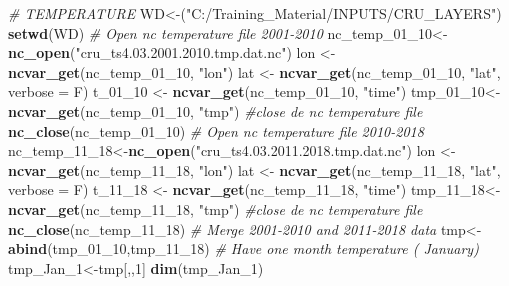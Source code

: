 \documentclass[
  10pt,
  b5paper,
]{book}
\newenvironment{Shaded}{\begin{snugshade}}{\end{snugshade}}
\newcommand{\CommentTok}[1]{\textcolor[rgb]{0.56,0.35,0.01}{\textit{#1}}}
\newcommand{\DataTypeTok}[1]{\textcolor[rgb]{0.13,0.29,0.53}{#1}}
\newcommand{\DecValTok}[1]{\textcolor[rgb]{0.00,0.00,0.81}{#1}}
\newcommand{\KeywordTok}[1]{\textcolor[rgb]{0.13,0.29,0.53}{\textbf{#1}}}
\newcommand{\NormalTok}[1]{#1}
\newcommand{\StringTok}[1]{\textcolor[rgb]{0.31,0.60,0.02}{#1}}
\begin{document}
\begin{Shaded}
\begin{Highlighting}[]
\CommentTok{# TEMPERATURE}
\NormalTok{WD<-(}\StringTok{"C:/Training_Material/INPUTS/CRU_LAYERS"}\NormalTok{)}
\KeywordTok{setwd}\NormalTok{(WD)}
 \CommentTok{# Open nc temperature file 2001-2010}
\NormalTok{nc_temp_}\DecValTok{01}\NormalTok{_}\DecValTok{10}\NormalTok{<-}\KeywordTok{nc_open}\NormalTok{(}\StringTok{"cru_ts4.03.2001.2010.tmp.dat.nc"}\NormalTok{)}
\NormalTok{ lon <-}\StringTok{ }\KeywordTok{ncvar_get}\NormalTok{(nc_temp_}\DecValTok{01}\NormalTok{_}\DecValTok{10}\NormalTok{, }\StringTok{"lon"}\NormalTok{)}
\NormalTok{lat <-}\StringTok{ }\KeywordTok{ncvar_get}\NormalTok{(nc_temp_}\DecValTok{01}\NormalTok{_}\DecValTok{10}\NormalTok{, }\StringTok{"lat"}\NormalTok{, }\DataTypeTok{verbose =}\NormalTok{ F)}
\NormalTok{t_}\DecValTok{01}\NormalTok{_}\DecValTok{10}\NormalTok{ <-}\StringTok{ }\KeywordTok{ncvar_get}\NormalTok{(nc_temp_}\DecValTok{01}\NormalTok{_}\DecValTok{10}\NormalTok{, }\StringTok{"time"}\NormalTok{)}
\NormalTok{ tmp_}\DecValTok{01}\NormalTok{_}\DecValTok{10}\NormalTok{<-}\KeywordTok{ncvar_get}\NormalTok{(nc_temp_}\DecValTok{01}\NormalTok{_}\DecValTok{10}\NormalTok{, }\StringTok{"tmp"}\NormalTok{)}
 \CommentTok{#close de nc temperature file}
 \KeywordTok{nc_close}\NormalTok{(nc_temp_}\DecValTok{01}\NormalTok{_}\DecValTok{10}\NormalTok{) }
 \CommentTok{# Open nc temperature file 2010-2018}
\NormalTok{nc_temp_}\DecValTok{11}\NormalTok{_}\DecValTok{18}\NormalTok{<-}\KeywordTok{nc_open}\NormalTok{(}\StringTok{"cru_ts4.03.2011.2018.tmp.dat.nc"}\NormalTok{)}
\NormalTok{ lon <-}\StringTok{ }\KeywordTok{ncvar_get}\NormalTok{(nc_temp_}\DecValTok{11}\NormalTok{_}\DecValTok{18}\NormalTok{, }\StringTok{"lon"}\NormalTok{)}
\NormalTok{lat <-}\StringTok{ }\KeywordTok{ncvar_get}\NormalTok{(nc_temp_}\DecValTok{11}\NormalTok{_}\DecValTok{18}\NormalTok{, }\StringTok{"lat"}\NormalTok{, }\DataTypeTok{verbose =}\NormalTok{ F)}
\NormalTok{t_}\DecValTok{11}\NormalTok{_}\DecValTok{18}\NormalTok{ <-}\StringTok{ }\KeywordTok{ncvar_get}\NormalTok{(nc_temp_}\DecValTok{11}\NormalTok{_}\DecValTok{18}\NormalTok{, }\StringTok{"time"}\NormalTok{)}
\NormalTok{ tmp_}\DecValTok{11}\NormalTok{_}\DecValTok{18}\NormalTok{<-}\KeywordTok{ncvar_get}\NormalTok{(nc_temp_}\DecValTok{11}\NormalTok{_}\DecValTok{18}\NormalTok{, }\StringTok{"tmp"}\NormalTok{)}
 \CommentTok{#close de nc temperature file}
 \KeywordTok{nc_close}\NormalTok{(nc_temp_}\DecValTok{11}\NormalTok{_}\DecValTok{18}\NormalTok{) }
 \CommentTok{# Merge 2001-2010 and 2011-2018 data }
\NormalTok{ tmp<-}\KeywordTok{abind}\NormalTok{(tmp_}\DecValTok{01}\NormalTok{_}\DecValTok{10}\NormalTok{,tmp_}\DecValTok{11}\NormalTok{_}\DecValTok{18}\NormalTok{)}
 \CommentTok{# Have one month temperature ( January)}
\NormalTok{ tmp_Jan_}\DecValTok{1}\NormalTok{<-tmp[,,}\DecValTok{1}\NormalTok{]}
 \KeywordTok{dim}\NormalTok{(tmp_Jan_}\DecValTok{1}\NormalTok{)}
\end{Highlighting}
\end{Shaded}
\end{document}
